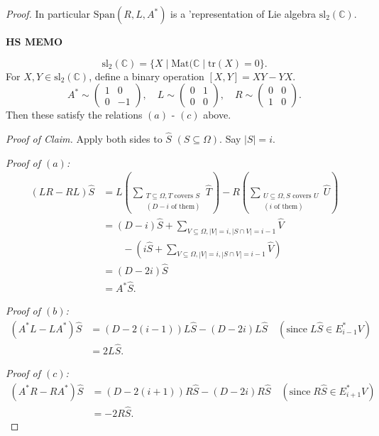 \documentclass[
]{book}
\theoremstyle{definition}
\theoremstyle{definition}
\theoremstyle{definition}
\theoremstyle{definition}
\theoremstyle{remark}
\begin{document}
\begin{proof}
In particular \(\mathrm{Span}(R,L, A^*)\) is a 'representation of Lie algebra \(\mathrm{sl}_2(\mathbb{C})\).

\textbf{HS MEMO}

\[\mathrm{sl}_2(\mathbb{C}) = \{X\mid \mathrm{Mat}(\mathbb{C} \mid \mathrm{tr}(X) = 0\}.\]
For \(X, Y\in \mathrm{sl}_2(\mathbb{C})\), define a binary operation \([X, Y] = XY - YX\).
\[A^*\sim \begin{pmatrix} 1 & 0 \\ 0 & -1\end{pmatrix}, \quad L\sim \begin{pmatrix} 0 & 1 \\ 0 & 0\end{pmatrix}, \quad R\sim \begin{pmatrix} 0 & 0 \\ 1 & 0\end{pmatrix}.\]
Then these satisfy the relations \((a)\) - \((c)\) above.

\emph{Proof of Claim.}
Apply both sides to \(\hat{S}\) \quad \((S\subseteq \Omega)\). Say \(|S| = i\).

\emph{Proof of \((a)\):}
\begin{align} 
(LR - RL)\hat{S} & = L\left(\sum_{\substack{T \subseteq \Omega, T \text{ covers }S\\(D-i \text{ of them})}}\hat{T}\right) - R \left(\sum_{\substack{U \subseteq \Omega, S \text{ covers }U\\(i \text{ of them})}}\hat{U}\right)\\
& = (D-i)\hat{S} + \sum_{V \subseteq \Omega, |V| = i, |S\cap V| = i-1}\hat{V}\\
& \qquad - \left(i\hat{S} + \sum_{V \subseteq \Omega, |V| = i, |S\cap V| = i-1}\hat{V}\right)\\
& = (D-2i)\hat{S}\\
& = A^*\hat{S}.
\end{align}

\emph{Proof of \((b)\):}
\begin{align} 
(A^*L - LA^*)\hat{S} & = (D-2(i-1))L\hat{S} - (D-2i)L\hat{S} \quad (\text{since} \; L\hat{S}\in E^*_{i-1}V)\\
& = 2L\hat{S}.
\end{align}

\emph{Proof of \((c)\):}
\begin{align} 
(A^*R - RA^*)\hat{S} & = (D-2(i+1))R\hat{S} - (D-2i)R\hat{S} \quad (\text{since} \; R\hat{S}\in E^*_{i+1}V)\\
& = -2R\hat{S}.
\end{align}


\end{proof}
\end{document}
